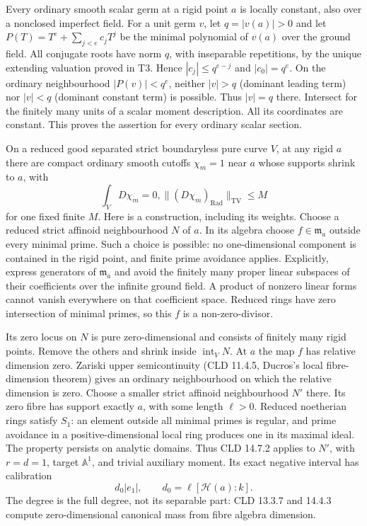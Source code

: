 \documentclass[
  10pt,
]{article}
\begin{document}
Every ordinary smooth scalar germ at a rigid point \(a\) is locally
constant, also over a nonclosed imperfect field. For a unit germ \(v\),
let \(q=|v(a)|>0\) and let \(P(T)=T^e+\sum_{j<e}c_jT^j\) be the minimal
polynomial of \(v(a)\) over the ground field. All conjugate roots have
norm \(q\), with inseparable repetitions, by the unique extending
valuation proved in T3. Hence \(|c_j|\leq q^{e-j}\) and \(|c_0|=q^e\).
On the ordinary neighbourhood \(|P(v)|<q^e\), neither \(|v|>q\)
(dominant leading term) nor \(|v|<q\) (dominant constant term) is
possible. Thus \(|v|=q\) there. Intersect for the finitely many units of
a scalar moment description. All its coordinates are constant. This
proves the assertion for every ordinary scalar section.

On a reduced good separated strict boundaryless pure curve \(V\), at any
rigid \(a\) there are compact ordinary smooth cutoffs \(\chi_m=1\) near
\(a\) whose supports shrink to \(a\), with \[
             \int_V D\chi_m=0,
             \|(D\chi_m)_{\mathrm{Rad}}\|_{\mathrm{TV}}\leq M
\] for one fixed finite \(M\). Here is a construction, including its
weights. Choose a reduced strict affinoid neighbourhood \(N\) of \(a\).
In its algebra choose \(f\in\mathfrak m_a\) outside every minimal prime.
Such a choice is possible: no one-dimensional component is contained in
the rigid point, and finite prime avoidance applies. Explicitly, express
generators of \(\mathfrak m_a\) and avoid the finitely many proper
linear subspaces of their coefficients over the infinite ground field. A
product of nonzero linear forms cannot vanish everywhere on that
coefficient space. Reduced rings have zero intersection of minimal
primes, so this \(f\) is a non-zero-divisor.

Its zero locus on \(N\) is pure zero-dimensional and consists of
finitely many rigid points. Remove the others and shrink inside
\(\operatorname{int}_V N\). At \(a\) the map \(f\) has relative
dimension zero. Zariski upper semicontinuity (CLD 11.4.5, Ducros's local
fibre-dimension theorem) gives an ordinary neighbourhood on which the
relative dimension is zero. Choose a smaller strict affinoid
neighbourhood \(N'\) there. Its zero fibre has support exactly \(a\),
with some length \(\ell>0\). Reduced noetherian rings satisfy \(S_1\):
an element outside all minimal primes is regular, and prime avoidance in
a positive-dimensional local ring produces one in its maximal ideal. The
property persists on analytic domains. Thus CLD 14.7.2 applies to
\(N'\), with \(r=d=1\), target \(\mathbb A^1\), and trivial auxiliary
moment. Its exact negative interval has calibration \[
                      d_0|e_1|,
                  \qquad d_0=\ell[\mathcal H(a):k].
\] The degree is the full degree, not its separable part: CLD 13.3.7 and
14.4.3 compute zero-dimensional canonical mass from fibre algebra
dimension.
\end{document}
